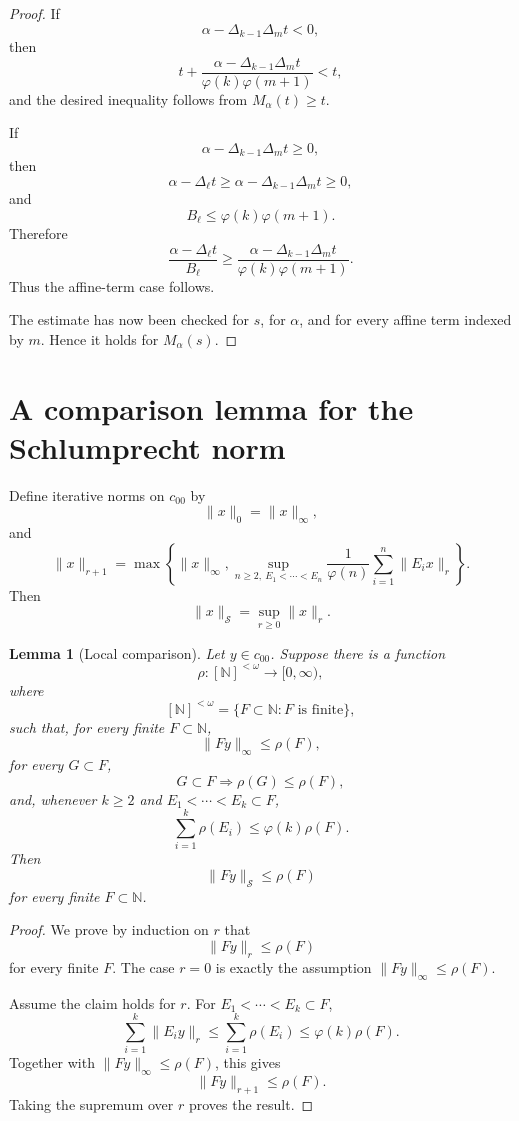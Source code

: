 \documentclass[11pt]{article}
\newcommand{\ph}{\varphi}
\newcommand{\N}{\mathbb N}
\newcommand{\Ssp}{\mathcal S}
\newcommand{\Bell}[1]{B_{#1}}
\newcommand{\Delt}[1]{\Delta_{#1}}
\newtheorem*{lemma*}{Lemma}
\begin{document}
\begin{proof}
If
\[
 \alpha-\Delt{k-1}\Delt{m}t<0,
\]
then
\[
 t+
 \frac{\alpha-\Delt{k-1}\Delt{m}t}
      {\ph(k)\ph(m+1)}
 <t,
\]
and the desired inequality follows from \(M_\alpha(t)\ge t\).

If
\[
 \alpha-\Delt{k-1}\Delt{m}t\ge 0,
\]
then
\[
 \alpha-\Delt{\ell}t
 \ge
 \alpha-\Delt{k-1}\Delt{m}t
 \ge 0,
\]
and
\[
 \Bell{\ell}\le \ph(k)\ph(m+1).
\]
Therefore
\[
 \frac{\alpha-\Delt{\ell}t}{\Bell{\ell}}
 \ge
 \frac{\alpha-\Delt{k-1}\Delt{m}t}
      {\ph(k)\ph(m+1)}.
\]
Thus the affine-term case follows.

The estimate has now been checked for \(s\), for \(\alpha\), and for every
affine term indexed by \(m\).  Hence it holds for \(M_\alpha(s)\).
\end{proof}

\section{A comparison lemma for the Schlumprecht norm}

Define iterative norms on \(c_{00}\) by
\[
 \|x\|_0=\|x\|_\infty,
\]
and
\[
 \|x\|_{r+1}
 =
 \max\left\{
 \|x\|_\infty,
 \sup_{n\ge 2,\ E_1<\cdots<E_n}
 \frac{1}{\ph(n)}
 \sum_{i=1}^n \|E_i x\|_r
 \right\}.
\]
Then
\[
 \|x\|_{\Ssp}=\sup_{r\ge 0}\|x\|_r.
\]

\begin{lemma*}[Local comparison]
Let \(y\in c_{00}\).  Suppose there is a function
\[
 \rho:[\N]^{<\omega}\to [0,\infty),
\]
where
\[
 [\N]^{<\omega}=\{F\subset \N:F\text{ is finite}\},
\]
such that, for every finite \(F\subset\N\),
\[
 \|Fy\|_\infty\le \rho(F),
\]
for every \(G\subset F\),
\[
 G\subset F \Longrightarrow \rho(G)\le \rho(F),
\]
and, whenever \(k\ge 2\) and \(E_1<\cdots<E_k\subset F\),
\[
 \sum_{i=1}^k \rho(E_i)\le \ph(k)\rho(F).
\]
Then
\[
 \|Fy\|_{\Ssp}\le \rho(F)
\]
for every finite \(F\subset\N\).
\end{lemma*}

\begin{proof}
We prove by induction on \(r\) that
\[
 \|Fy\|_r\le \rho(F)
\]
for every finite \(F\).  The case \(r=0\) is exactly the assumption
\(\|Fy\|_\infty\le \rho(F)\).

Assume the claim holds for \(r\).  For \(E_1<\cdots<E_k\subset F\),
\[
 \sum_{i=1}^k \|E_i y\|_r
 \le
 \sum_{i=1}^k \rho(E_i)
 \le
 \ph(k)\rho(F).
\]
Together with \(\|Fy\|_\infty\le\rho(F)\), this gives
\[
 \|Fy\|_{r+1}\le \rho(F).
\]
Taking the supremum over \(r\) proves the result.
\end{proof}
\end{document}
